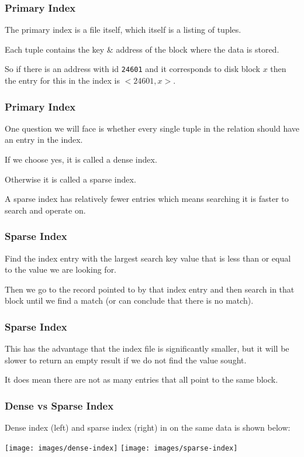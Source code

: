\begin{frame}
\frametitle{Primary Index}

The primary index is a file itself, which itself is a listing of tuples. 

Each tuple contains the key \& address of the block where the data is stored. 

So if there is an address with id \texttt{24601} and it corresponds to disk block $x$ then the entry for this in the index is $<24601, x>$. 

\end{frame}

\begin{frame}
\frametitle{Primary Index}

One question we will face is whether every single tuple in the relation should have an entry in the index. 

If we choose yes, it is called a \alert{dense index}. 

Otherwise it is called a \alert{sparse index}. 

A sparse index has relatively fewer entries which means searching it is faster to search and operate on. 


\end{frame}

\begin{frame}
\frametitle{Sparse Index}

Find the index entry with the largest search key value that is less than or equal to the value we are looking for. 

Then we go to the record pointed to by that index entry and then search in that block until we find a match (or can conclude that there is no match). 

\end{frame}

\begin{frame}
\frametitle{Sparse Index}

This has the advantage that the index file is significantly smaller, but it will be slower to return an empty result if we do not find the value sought.

It does mean there are not as many entries that all point to the same block.

\end{frame}

\begin{frame}
\frametitle{Dense vs Sparse Index}
Dense index (left) and sparse index (right) in on the same data is shown below:

\begin{center}
\texttt{[image: images/dense-index]}
\texttt{[image: images/sparse-index]}
\end{center}

\end{frame}


